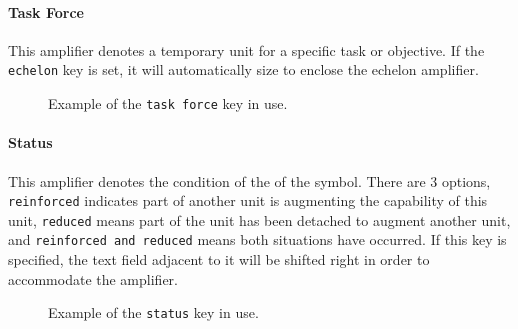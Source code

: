 \documentclass[a4paper, titlepage]{article}
\begin{document}
\paragraph{Task Force}

This amplifier denotes a temporary unit for a specific task or objective. If the \texttt{echelon} key is set, it will automatically size to enclose the echelon amplifier.

 \begin{figure}[H]
\centering
{}
\caption{Example of the \texttt{task force} key in use.}
\end{figure}


\paragraph{Status}

This amplifier denotes the condition of the of the symbol. There are 3 options, \texttt{reinforced} indicates part of another unit is augmenting the capability of this unit, \texttt{reduced} means part of the unit has been detached to augment another unit, and \texttt{reinforced and reduced} means both situations have occurred. If this key is specified, the text field adjacent to it will be shifted right in order to accommodate the amplifier.

\begin{figure}[H]
\centering
{}
\caption{Example of the \texttt{status} key in use.}
\end{figure}
\end{document}

